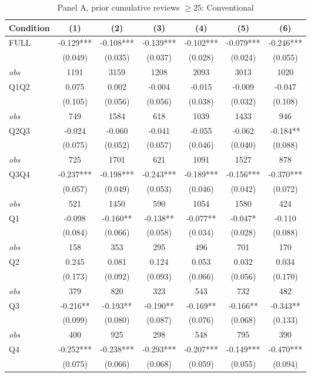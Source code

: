 \begin{table}[!htbp]
\centering
\caption{Panel A, prior cumulative reviews $\geq25$: Conventional}
\begin{tabular}{lcccccc}
\toprule
Condition & (1) & (2) & (3) & (4) & (5) & (6) \\
\midrule
FULL & -0.129*** & -0.108*** & -0.139*** & -0.102*** & -0.079*** & -0.246*** \\
 & (0.049) & (0.035) & (0.037) & (0.028) & (0.024) & (0.055) \\
\textit{obs} & 1191 & 3159 & 1208 & 2093 & 3013 & 1020 \\
Q1Q2 & 0.075 & 0.002 & -0.004 & -0.015 & -0.009 & -0.047 \\
 & (0.105) & (0.056) & (0.056) & (0.038) & (0.032) & (0.108) \\
\textit{obs} & 749 & 1584 & 618 & 1039 & 1433 & 946 \\
Q2Q3 & -0.024 & -0.060 & -0.041 & -0.055 & -0.062 & -0.184** \\
 & (0.075) & (0.052) & (0.057) & (0.046) & (0.040) & (0.088) \\
\textit{obs} & 725 & 1701 & 621 & 1091 & 1527 & 878 \\
Q3Q4 & -0.237*** & -0.198*** & -0.243*** & -0.189*** & -0.156*** & -0.370*** \\
 & (0.057) & (0.049) & (0.053) & (0.046) & (0.042) & (0.072) \\
\textit{obs} & 521 & 1450 & 590 & 1054 & 1580 & 424 \\
Q1 & -0.098 & -0.160** & -0.138** & -0.077** & -0.047* & -0.110 \\
 & (0.084) & (0.066) & (0.058) & (0.034) & (0.028) & (0.088) \\
\textit{obs} & 158 & 353 & 295 & 496 & 701 & 170 \\
Q2 & 0.245 & 0.081 & 0.124 & 0.053 & 0.032 & 0.034 \\
 & (0.173) & (0.092) & (0.093) & (0.066) & (0.056) & (0.170) \\
\textit{obs} & 379 & 820 & 323 & 543 & 732 & 482 \\
Q3 & -0.216** & -0.193** & -0.190** & -0.169** & -0.166** & -0.343** \\
 & (0.099) & (0.080) & (0.087) & (0.076) & (0.068) & (0.133) \\
\textit{obs} & 400 & 925 & 298 & 548 & 795 & 390 \\
Q4 & -0.252*** & -0.238*** & -0.293*** & -0.207*** & -0.149*** & -0.470*** \\
 & (0.075) & (0.066) & (0.068) & (0.059) & (0.055) & (0.094) \\

\end{tabular}
\end{table}
